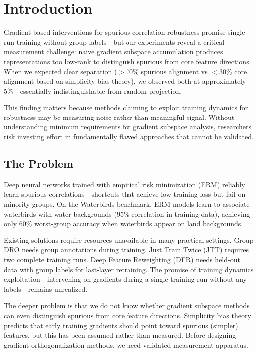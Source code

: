 \section{Introduction}

Gradient-based interventions for spurious correlation robustness promise single-run training without group labels---but our experiments reveal a critical measurement challenge: naive gradient subspace accumulation produces representations too low-rank to distinguish spurious from core feature directions. When we expected clear separation ($>$70\% spurious alignment vs $<$30\% core alignment based on simplicity bias theory), we observed both at approximately 5\%---essentially indistinguishable from random projection.

This finding matters because methods claiming to exploit training dynamics for robustness may be measuring noise rather than meaningful signal. Without understanding minimum requirements for gradient subspace analysis, researchers risk investing effort in fundamentally flawed approaches that cannot be validated.

\subsection{The Problem}

Deep neural networks trained with empirical risk minimization (ERM) reliably learn spurious correlations---shortcuts that achieve low training loss but fail on minority groups. On the Waterbirds benchmark, ERM models learn to associate waterbirds with water backgrounds (95\% correlation in training data), achieving only 60\% worst-group accuracy when waterbirds appear on land backgrounds.

Existing solutions require resources unavailable in many practical settings. Group DRO needs group annotations during training. Just Train Twice (JTT) requires two complete training runs. Deep Feature Reweighting (DFR) needs held-out data with group labels for last-layer retraining. The promise of training dynamics exploitation---intervening on gradients during a single training run without any labels---remains unrealized.

The deeper problem is that we do not know whether gradient subspace methods can even distinguish spurious from core feature directions. Simplicity bias theory predicts that early training gradients should point toward spurious (simpler) features, but this has been assumed rather than measured. Before designing gradient orthogonalization methods, we need validated measurement apparatus.

